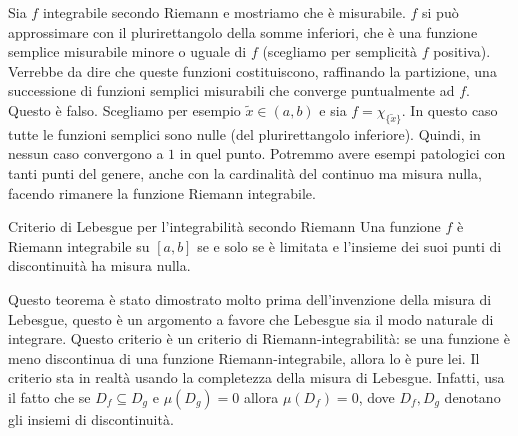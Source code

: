 \documentclass[a4paper]{article}
\begin{document}
\begin{radioactive}
Sia \(f\) integrabile secondo Riemann e mostriamo che è misurabile.
 \(f\) si può approssimare
con il plurirettangolo
della somme inferiori, che è una funzione semplice misurabile minore o uguale di \(f\)
(scegliamo per semplicità \(f\) positiva). Verrebbe da dire che
queste funzioni costituiscono, raffinando la partizione, una successione
di funzioni semplici misurabili che converge puntualmente ad \(f\).
Questo è falso. Scegliamo per esempio \(\tilde x \in (a,b)\)
e sia \(f = \chi_{\{\tilde x\}}\).
In questo caso tutte le funzioni semplici sono nulle (del plurirettangolo inferiore).
Quindi, in nessun caso convergono a \(1\) in quel punto.
Potremmo avere esempi patologici con tanti punti del genere, anche con la cardinalità del continuo
ma misura nulla, facendo rimanere la funzione Riemann integrabile.
\end{radioactive}

\begin{radioactive}
\begin{snippettheorem}{Criterio di Lebesgue per l'integrabilità secondo Riemann}
    Una funzione \(f\) è Riemann integrabile su \([a,b]\)
    se e solo se è limitata e l'insieme dei suoi punti di discontinuità ha misura nulla.
\end{snippettheorem}
\end{radioactive}

\begin{radioactive}
Questo teorema è stato dimostrato molto prima dell'invenzione della misura di Lebesgue,
questo è un argomento a favore che Lebesgue sia il modo naturale di integrare.
Questo criterio è un criterio di Riemann-integrabilità:
se una funzione è meno discontinua di una funzione Riemann-integrabile, allora lo è pure lei.
Il criterio sta in realtà usando la completezza della misura di Lebesgue.
Infatti, usa il fatto che se \(D_f \subseteq D_g\)
e \(\mu(D_g) = 0\) allora \(\mu(D_f) = 0\),
dove \(D_f,D_g\) denotano gli insiemi di discontinuità.
\end{radioactive}
\end{document}
